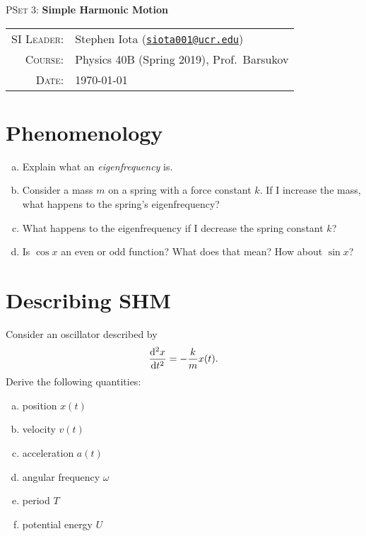 \documentclass[12pt]{article}
\newcommand{\email}[1]{\texttt{\href{mailto:#1}{#1}}}
\begin{document}
\begin{center}

\Large{\textsc{PSet 3}: \textbf{Simple Harmonic Motion}}
\end{center}
\vspace{.5mm}



\begin{tabular}{rl}
\textsc{SI Leader}:
&
Stephen Iota (\email{siota001@ucr.edu})
\\
\textsc{Course}:
&
Physics 40B (Spring 2019), Prof.~Barsukov
\\
\textsc{Date}:
&
\today
\end{tabular}


\section{Phenomenology}
\begin{enumerate}[(a)]
	\item Explain what an \textit{eigenfrequency} is.
	\item Consider a mass $m$ on a spring with a force constant $k$. If I increase the mass, what happens to the spring's eigenfrequency? 
	\item What happens to the eigenfrequency if I decrease the spring constant $k$?
	\item Is $\cos{x}$ an even or odd function? What does that mean? How about $\sin{x}$?
\end{enumerate}




\section{Describing SHM}

Consider an oscillator described by $$\dv[2]{x}{t} = - \frac{k}{m}x(t).$$
Derive the following quantities:
\begin{enumerate}[(a)]
\item position $x(t)$
\item velocity $v(t)$
\item acceleration $a(t)$
\item angular frequency $\omega$
\item period $T$
\item potential energy $U$
\end{enumerate}
\end{document}
